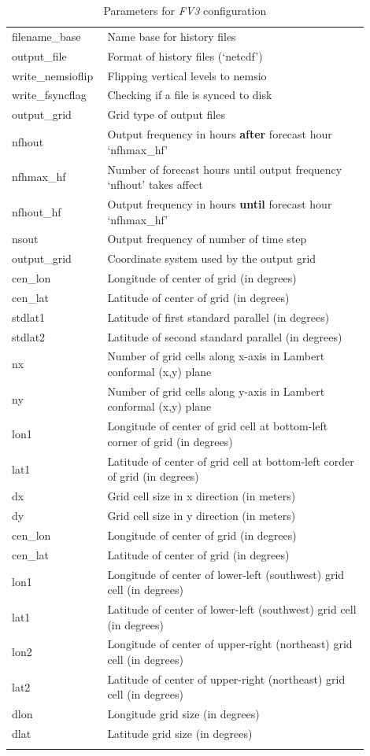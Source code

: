 \documentclass[11pt,fleqn]{report}              %
\begin{document}
{\begin{longtable}{p{0.2\linewidth} | p{0.7\linewidth}  }
 filename\_base & Name base for history files  \\
 output\_file & Format of history files (`netcdf')   \\
 write\_nemsioflip & Flipping vertical levels to nemsio   \\
 write\_fsyncflag & Checking if a file is synced to disk   \\
 output\_grid & Grid type of output files  \\
 nfhout & Output frequency in hours {\bf after} forecast hour `nfhmax\_hf'  \\
 nfhmax\_hf & Number of forecast hours until output frequency `nfhout' takes affect  \\
 nfhout\_hf & Output frequency in hours {\bf until} forecast hour `nfhmax\_hf' \\
 nsout & Output frequency of number of time step \\
\hdashline
output\_grid & Coordinate system used by the output grid  \\
\hdashline
cen\_lon & Longitude of center of grid (in degrees) \\
cen\_lat & Latitude of center of grid (in degrees) \\
stdlat1 & Latitude of first standard parallel (in degrees) \\
stdlat2 & Latitude of second standard parallel (in degrees) \\
nx & Number of grid cells along x-axis in Lambert conformal (x,y) plane  \\
ny & Number of grid cells along y-axis in Lambert conformal (x,y) plane  \\
lon1 & Longitude of center of grid cell at bottom-left corner of grid (in degrees) \\
lat1 & Latitude of center of grid cell at bottom-left corder of grid (in degrees) \\
dx & Grid cell size in x direction (in meters) \\
dy & Grid cell size in y direction (in meters) \\
\hdashline
cen\_lon & Longitude of center of grid (in degrees) \\
cen\_lat & Latitude of center of grid (in degrees) \\
lon1 & Longitude of center of lower-left (southwest) grid cell (in degrees) \\
lat1 & Latitude of center of lower-left (southwest) grid cell (in degrees) \\
lon2 & Longitude of center of upper-right (northeast) grid cell (in degrees) \\
lat2 & Latitude of center of upper-right (northeast) grid cell (in degrees) \\
dlon & Longitude grid size (in degrees) \\
dlat & Latitude grid size (in degrees) \\
\hline
\caption{Parameters for {\it FV3} configuration}
\label{table:fv3_mdl_config}
\end{longtable}
}
\end{document}
